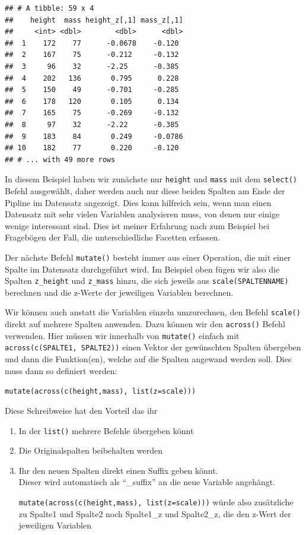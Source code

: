 \documentclass[
]{book}
\theoremstyle{definition}
\theoremstyle{definition}
\theoremstyle{definition}
\theoremstyle{definition}
\theoremstyle{remark}
\begin{document}
\begin{verbatim}
## # A tibble: 59 x 4
##    height  mass height_z[,1] mass_z[,1]
##     <int> <dbl>        <dbl>      <dbl>
##  1    172    77      -0.0678    -0.120 
##  2    167    75      -0.212     -0.132 
##  3     96    32      -2.25      -0.385 
##  4    202   136       0.795      0.228 
##  5    150    49      -0.701     -0.285 
##  6    178   120       0.105      0.134 
##  7    165    75      -0.269     -0.132 
##  8     97    32      -2.22      -0.385 
##  9    183    84       0.249     -0.0786
## 10    182    77       0.220     -0.120 
## # ... with 49 more rows
\end{verbatim}

In diesem Beispiel haben wir zunächste nur \texttt{height} und \texttt{mass} mit dem \texttt{select()} Befehl ausgewählt, daher werden auch nur diese beiden Spalten am Ende der Pipline im Datensatz angezeigt. Dies kann hilfreich sein, wenn man einen Datensatz mit sehr vielen Variablen analysieren muss, von denen nur einige wenige interessant sind. Dies ist meiner Erfahrung nach zum Beispiel bei Fragebögen der Fall, die unterschiedliche Facetten erfassen.

Der nächste Befehl \texttt{mutate()} besteht immer aus einer Operation, die mit einer Spalte im Datensatz durchgeführt wird. Im Beispiel oben fügen wir also die Spalten \texttt{z\_height} und \texttt{z\_mass} hinzu, die sich jeweils aus \texttt{scale(SPALTENNAME)} berechnen und die z-Werte der jeweiligen Variablen berechnen.

Wir können auch anstatt die Variablen einzeln umzurechnen, den Befehl \texttt{scale()} direkt auf mehrere Spalten anwenden. Dazu können wir den \texttt{across()} Befehl verwenden. Hier müssen wir innerhalb von \texttt{mutate()} einfach mit \texttt{across(c(SPALTE1,\ SPALTE2))} einen Vektor der gewünschten Spalten übergeben und dann die Funktion(en), welche auf die Spalten angewand werden soll. Dies muss dann so definiert werden:

\texttt{mutate(across(c(height,mass),\ list(z=scale)))}

Diese Schreibweise hat den Vorteil das ihr

\begin{enumerate}
\def\labelenumi{\arabic{enumi}.}
\item
  In der \texttt{list()} mehrere Befehle übergeben könnt
\item
  Die Originalspalten beibehalten werden
\item
  Ihr den neuen Spalten direkt einen Suffix geben könnt.\\
  Dieser wird automatisch als ``\_suffix'' an die neue Variable angehängt.

  \texttt{mutate(across(c(height,mass),\ list(z=scale)))} würde also zusätzliche zu Spalte1 und Spalte2 noch Spalte1\_z und Spalte2\_z, die den z-Wert der jeweiligen Variablen
\end{enumerate}
\end{document}

